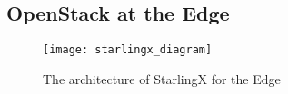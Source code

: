 \subsection{OpenStack at the Edge}

\begin{figure}
    \centering
    \texttt{[image: starlingx\_diagram]}	
    \label{fig:figure13}
    \caption{The architecture of StarlingX for the Edge}
\end{figure}

